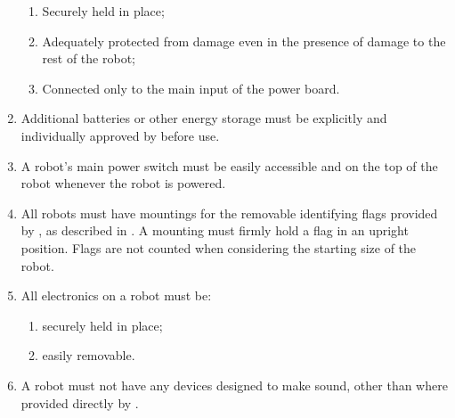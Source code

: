 \begin{enumerate}
  \begin{enumerate}
    \item Securely held in place;
    \item Adequately protected from damage even in the presence of damage to the
          rest of the robot;
    \item Connected only to the main input of the power board.
  \end{enumerate}
\item Additional batteries or other energy storage must be explicitly and
     individually approved by \org before use.
\item A robot's main power switch must be easily accessible and on the top of
      the robot whenever the robot is powered.
\item All robots must have mountings for the removable identifying flags
      provided by \org, as described in . A mounting
      must firmly hold a flag in an upright position. Flags are not counted
      when considering the starting size of the robot.
\item All electronics on a robot must be:
  \begin{enumerate}
    \item securely held in place;
    \item easily removable.
  \end{enumerate}
\item A robot must not have any devices designed to make sound, other than
      where provided directly by \org{}.
\end{enumerate}
